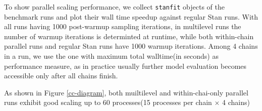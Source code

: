 \documentclass[landscape,a0paper,fontscale=0.5]{baposter} %
\begin{document}
\begin{poster}
{\begin{multicols}{2}
To show parallel scaling performance, we collect \texttt{\texttt{stanfit}} objects of the benchmark runs
and plot their wall time speedup against regular Stan runs. With all
runs having 1000 post-warmup sampling iterations, in
multilevel runs the number of warmup iterations is determinted at
runtime, while both within-chain parallel runs and regular Stan runs
have 1000 warmup iterations. Among 4 chains in a run, we use the
one with maximum total walltime(in seconds) as performance measure, as
in practice usually further model evaluation becomes accessible only
after all chains finish.

As shown in Figure \ref{cc-diagram}, both muiltilevel and
within-chai-only parallel runs exhibit good scaling up to 60
processes(15 processes per chain \(\times\) 4 chains)


\end{multicols}
\vspace{0.5em}
}







\end{poster}
\end{document}
